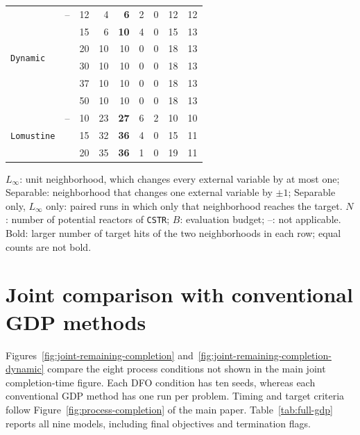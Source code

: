 \begin{table}[htbp]
\begin{threeparttable}
\begin{tabular}{@{}lrrrrrrrr@{}}
\midrule
\multirow{6}{*}{\texttt{Dynamic}} & -- & 12 & 4 & \textbf{6} & 2 & 0 & 12 & 12 \\
 &  & 15 & 6 & \textbf{10} & 4 & 0 & 15 & 13 \\
 &  & 20 & 10 & 10 & 0 & 0 & 18 & 13 \\
 &  & 30 & 10 & 10 & 0 & 0 & 18 & 13 \\
 &  & 37 & 10 & 10 & 0 & 0 & 18 & 13 \\
 &  & 50 & 10 & 10 & 0 & 0 & 18 & 13 \\
\midrule
\multirow{3}{*}{\texttt{Lomustine}} & -- & 10 & 23 & \textbf{27} & 6 & 2 & 10 & 10 \\
 &  & 15 & 32 & \textbf{36} & 4 & 0 & 15 & 11 \\
 &  & 20 & 35 & \textbf{36} & 1 & 0 & 19 & 11 \\
\bottomrule
\end{tabular}
\begin{tablenotes}[flushleft]\footnotesize
\item \(L_\infty\): unit neighborhood, which changes every external variable by at most one; Separable: neighborhood that changes one external variable by \(\pm1\); Separable only, \(L_\infty\) only: paired runs in which only that neighborhood reaches the target.
\(N\): number of potential reactors of \texttt{CSTR}; \(B\): evaluation budget; --: not applicable.
Bold: larger number of target hits of the two neighborhoods in each row; equal counts are not bold.
\end{tablenotes}
\end{threeparttable}
\end{table}
\FloatBarrier

\section{Joint comparison with conventional GDP methods}
\label{sec:supp-joint-comparison}
Figures~\ref{fig:joint-remaining-completion} and~\ref{fig:joint-remaining-completion-dynamic} compare the eight process conditions not shown in the main joint completion-time figure.
Each DFO condition has ten seeds, whereas each conventional GDP method has one run per problem.
Timing and target criteria follow Figure~\ifdefined\manuscriptwithsupplement\ref{fig:process-completion}\fi{} of the main paper.
Table~\ref{tab:full-gdp} reports all nine models, including final objectives and termination flags.

